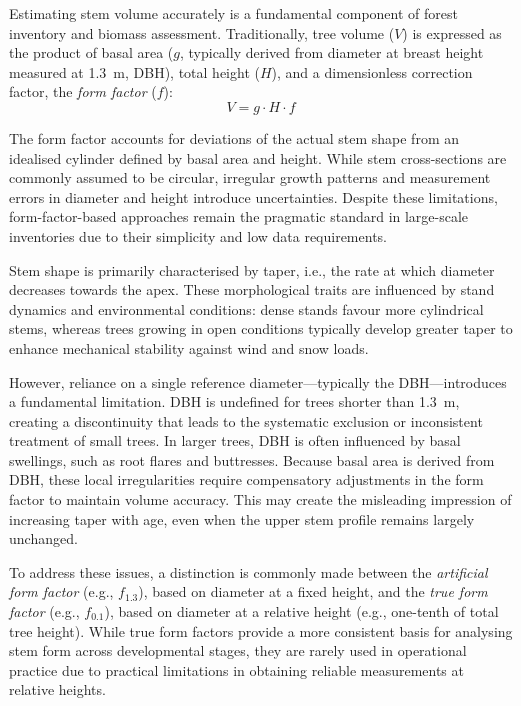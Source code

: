 \documentclass[twocolumn, bibliography=totoc]{scrartcl}
\begin{document}
Estimating stem volume accurately is a fundamental component of forest inventory and biomass assessment. Traditionally, tree volume ($V$) is expressed as the product of basal area ($g$, typically derived from diameter at breast height  measured at \qty{1.3}{m}, DBH), total height ($H$), and a dimensionless correction factor, the \emph{form factor} ($f$):
\begin{equation}
V = g \cdot H \cdot f
\end{equation}

The form factor accounts for deviations of the actual stem shape from an idealised cylinder defined by basal area and height. While stem cross-sections are commonly assumed to be circular, irregular growth patterns and measurement errors in diameter and height introduce uncertainties. Despite these limitations, form-factor-based approaches remain the pragmatic standard in large-scale inventories due to their simplicity and low data requirements.

Stem shape is primarily characterised by taper, i.e., the rate at which diameter decreases towards the apex. These morphological traits are influenced by stand dynamics and environmental conditions: dense stands favour more cylindrical stems, whereas trees growing in open conditions typically develop greater taper to enhance mechanical stability against wind and snow loads.

However, reliance on a single reference diameter—typically the DBH—introduces a fundamental limitation. DBH is undefined for trees shorter than \qty{1.3}{m}, creating a discontinuity that leads to the systematic exclusion or inconsistent treatment of small trees. In larger trees, DBH is often influenced by basal swellings, such as root flares and buttresses. Because basal area is derived from DBH, these local irregularities require compensatory adjustments in the form factor to maintain volume accuracy. This may create the misleading impression of increasing taper with age, even when the upper stem profile remains largely unchanged.

To address these issues, a distinction is commonly made between the \emph{artificial form factor} (e.g., $f_{1.3}$), based on diameter at a fixed height, and the \emph{true form factor} (e.g., $f_{0.1}$), based on diameter at a relative height (e.g., one-tenth of total tree height). While true form factors provide a more consistent basis for analysing stem form across developmental stages, they are rarely used in operational practice due to practical limitations in obtaining reliable measurements at relative heights.
\end{document}

